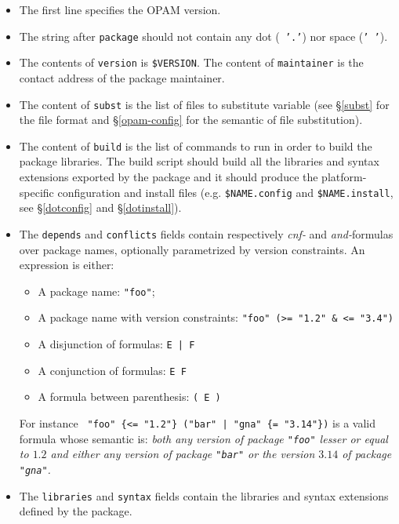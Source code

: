 \documentclass[a4paper,11pt]{article}
\begin{document}
\begin{itemize}

\item The first line specifies the OPAM version.

\item The string after {\tt package} should not contain any dot ({\tt
  '.'}) nor space ({\tt ' '}).

\item The contents of {\tt version} is \verb+$VERSION+. The content of
  {\tt maintainer} is the contact address of the package maintainer.

\item The content of {\tt subst} is the list of files to substitute
  variable (see \S\ref{subst} for the file format and
  \S\ref{opam-config} for the semantic of file substitution).

\item The content of {\tt build} is the list of commands to run in
  order to build the package libraries. The build script should build
  all the libraries and syntax extensions exported by the package and
  it should produce the platform-specific configuration and install
  files (e.g. \verb+$NAME.config+ and \verb+$NAME.install+, see
  \S\ref{dotconfig} and \S\ref{dotinstall}).

\item The {\tt depends} and {\tt conflicts} fields contain
  respectively {\em cnf-} and {\em and-}formulas over package names,
  optionally parametrized by version constraints. An expression is
  either:

\begin{itemize}
\item A package name: {\tt "foo"};
\item A package name with version constraints:
  \verb+"foo" (>= "1.2" & <= "3.4")+
\item A disjunction of formulas: \verb+E | F+
\item A conjunction of formulas: \verb+E F+
\item A formula between parenthesis: \verb+( E )+
\end{itemize}

For instance \verb+ "foo" {<= "1.2"} ("bar" | "gna" {= "3.14"})+ is a
valid formula whose semantic is: {\em both any version of package
  {\tt "foo"} lesser or equal to $1.2$ and either any version of package
  {\tt "bar"} or the version $3.14$ of package {\tt "gna"}.}  \\

\item The {\tt libraries} and {\tt syntax} fields contain the
  libraries and syntax extensions defined by the package.

\end{itemize}
\end{document}
